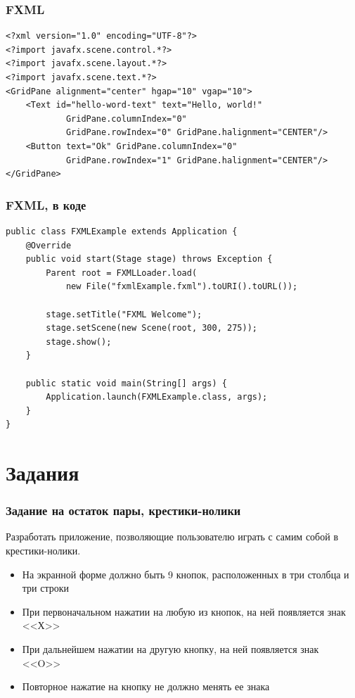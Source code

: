 \documentclass[xetex,mathserif,serif]{beamer}
\begin{document}
	\begin{frame}[fragile]
		\frametitle{FXML}
		\begin{verbatim}
<?xml version="1.0" encoding="UTF-8"?>
<?import javafx.scene.control.*?>
<?import javafx.scene.layout.*?>
<?import javafx.scene.text.*?>
<GridPane alignment="center" hgap="10" vgap="10">
    <Text id="hello-word-text" text="Hello, world!"
            GridPane.columnIndex="0"
            GridPane.rowIndex="0" GridPane.halignment="CENTER"/>
    <Button text="Ok" GridPane.columnIndex="0"
            GridPane.rowIndex="1" GridPane.halignment="CENTER"/>
</GridPane>
		\end{verbatim}
	\end{frame}

	\begin{frame}[fragile]
		\frametitle{FXML, в коде}
		\begin{verbatim}
public class FXMLExample extends Application {
    @Override
    public void start(Stage stage) throws Exception {
        Parent root = FXMLLoader.load(
            new File("fxmlExample.fxml").toURI().toURL());

        stage.setTitle("FXML Welcome");
        stage.setScene(new Scene(root, 300, 275));
        stage.show();
    }

    public static void main(String[] args) {
        Application.launch(FXMLExample.class, args);
    }
}
		\end{verbatim}
	\end{frame}

	\section{Задания}

	\begin{frame}
		\frametitle{Задание на остаток пары, крестики-нолики}
		Разработать приложение, позволяющие пользователю играть с самим собой в крестики-нолики. 
		\begin{itemize}
			\item На экранной форме должно быть 9 кнопок, расположенных в три столбца и три строки
			\item При первоначальном нажатии на любую из кнопок, на ней появляется знак <<Х>> 
			\item При дальнейшем нажатии на другую кнопку, на ней появляется знак <<O>>
			\item Повторное нажатие на кнопку не должно менять ее знака
		\end{itemize}
	\end{frame}
\end{document}
